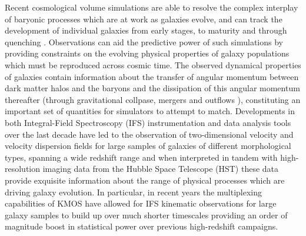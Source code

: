 \documentclass[fleqn,usenatbib]{mn2e}
\begin{document}
Recent cosmological volume simulations are able to resolve the complex interplay of baryonic processes which are at work as galaxies evolve, and can track the development of individual galaxies from early stages, to maturity and through quenching \citep{Dubois2014a,Vogelsberger2014b,Schaye2015}.
Observations can aid the predictive power of such simulations by providing constraints on the evolving physical properties of galaxy populations which must be reproduced across cosmic time.
The observed dynamical properties of galaxies contain information about the transfer of angular momentum between dark matter halos and the baryons and the dissipation of this angular momentum thereafter (through gravitational collpase, mergers and outflows \cite{Fall1983,Romanowsky2012,Fall2013}), constituting an important set of quantities for simulators to attempt to match.
Developments in both Integral-Field Spectroscopy (IFS) instrumentation and data analysis tools over the last decade have led to the observation of two-dimensional velocity and velocity dispersion fields for large samples of galaxies of different morphological types, spanning a wide redshift range \citep[e.g.][]{Sarzi2005,Flores2006,Epinat2008,ForsterSchreiber2009,Cappellari2011,Gnerucci2011,Epinat2012,Croom2012,Bundy2015,Wisnioski2015,Stott2016,Harrison2017,Swinbank2017} and when interpreted in tandem with high-resolution imaging data from the Hubble Space Telescope (HST) these data provide exquisite information about the range of physical processes which are driving galaxy evolution.
In particular, in recent years the multiplexing capabilities of KMOS have allowed for IFS kinematic observations for large galaxy samples to build up over much shorter timescales \citep{Sobral2013,Wisnioski2015,Stott2016,Mason2016,Harrison2017} providing an order of magnitude boost in statistical power over previous high-redshift campaigns.    
\end{document}
